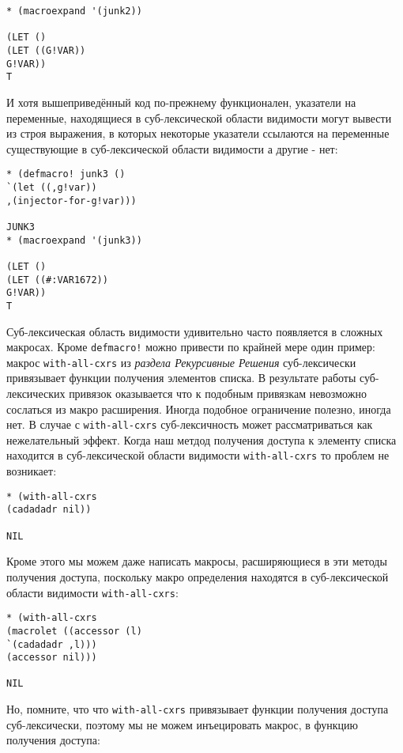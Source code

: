 \begin{verbatim}
* (macroexpand '(junk2))

(LET ()
(LET ((G!VAR))
G!VAR))
T
\end{verbatim}

И хотя вышеприведённый код по-прежнему функционален, указатели на переменные, находящиеся в суб-лексической области видимости могут вывести из строя выражения, в которых некоторые указатели ссылаются на переменные существующие в суб-лексической области видимости а другие - нет:

\begin{verbatim}
* (defmacro! junk3 ()
`(let ((,g!var))
,(injector-for-g!var)))

JUNK3
* (macroexpand '(junk3))

(LET ()
(LET ((#:VAR1672))
G!VAR))
T
\end{verbatim}

Суб-лексическая область видимости удивительно часто появляется в сложных макросах. Кроме \verb"defmacro!" можно привести по крайней мере один пример: макрос \verb"with-all-cxrs" из \emph{раздела Рекурсивные Решения} суб-лексически привязывает функции получения элементов списка. В результате работы суб-лексических привязок оказывается что к подобным привязкам невозможно сослаться из макро расширения. Иногда подобное ограничение полезно, иногда нет. В случае с \verb"with-all-cxrs" суб-лексичность может рассматриваться как нежелательный эффект. Когда наш метдод получения доступа к элементу списка находится в суб-лексической области видимости \verb"with-all-cxrs" то проблем не возникает:

\begin{verbatim}
* (with-all-cxrs
(cadadadr nil))

NIL
\end{verbatim}

Кроме этого мы можем даже написать макросы, расширяющиеся в эти методы получения доступа, поскольку макро определения находятся в суб-лексической области видимости \verb"with-all-cxrs":

\begin{verbatim}
* (with-all-cxrs
(macrolet ((accessor (l)
`(cadadadr ,l)))
(accessor nil)))

NIL
\end{verbatim}

Но, помните, что что \verb"with-all-cxrs" привязывает функции получения доступа суб-лексически, поэтому мы не можем инъецировать макрос, в функцию получения доступа:

